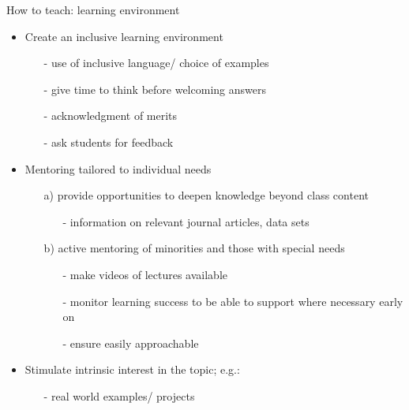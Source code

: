 \begin{frame}{How to teach: learning environment} %
	\vspace{-2.5mm}
	\pause
	\begin{itemize}%
		\item<+-> Create an \alert{inclusive} learning environment %
		\begin{itemize}[<+->]
			\item[-] use of inclusive language/ choice of examples
			\item[-] give time to think before welcoming answers
			\item[-] acknowledgment of merits
			\item[-] ask students for feedback 
		\end{itemize}
	\vspace{1mm}
		\item<+-> \alert{Mentoring} tailored to \alert{individual needs}
		\begin{itemize}[<+->]
			\item[a)] provide opportunities to deepen knowledge beyond class content 
			\begin{itemize}
				\item[-] information on relevant journal articles, data sets
			\end{itemize}
			\item[b)]  active mentoring of minorities and those with special needs
			\begin{itemize}
				\item[-] make videos of lectures available %
				\item[-] monitor learning success to be able to support where necessary early on 
				\item[-] ensure easily approachable %
			\end{itemize}
		\end{itemize}		
		\vspace{1mm}		
		\item<+-> Stimulate \alert{intrinsic interest} in the topic; e.g.: 
		\begin{itemize}[<+->]
			\item[-] real world examples/ projects %
		\end{itemize}
	\end{itemize}
\end{frame}

